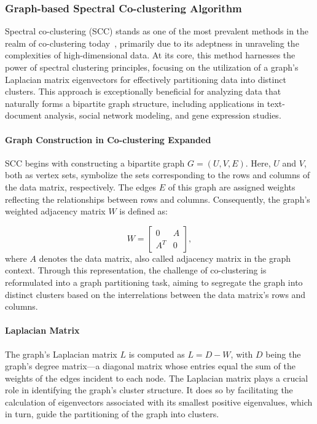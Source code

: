 \documentclass[journal]{IEEEtran}
\renewcommand{\cite}[1]{~\autocite{#1}}
\begin{document}
\subsubsection{Graph-based Spectral Co-clustering Algorithm}

Spectral co-clustering (SCC) stands as one of the most prevalent methods in the realm of co-clustering today\cite{vonluxburg2007TutorialSpectralClustering}, primarily due to its adeptness in unraveling the complexities of high-dimensional data. At its core, this method harnesses the power of spectral clustering principles, focusing on the utilization of a graph's Laplacian matrix eigenvectors for effectively partitioning data into distinct clusters. This approach is exceptionally beneficial for analyzing data that naturally forms a bipartite graph structure, including applications in text-document analysis, social network modeling, and gene expression studies.


\paragraph{Graph Construction in Co-clustering Expanded}

SCC begins with constructing a bipartite graph $G=(U,V,E)$. Here, $U$ and $V$, both as vertex sets, symbolize the sets corresponding to the rows and columns of the data matrix, respectively. The edges $E$ of this graph are assigned weights reflecting the relationships between rows and columns. Consequently, the graph's weighted adjacency matrix $W$ is defined as:

$$ W = \begin{bmatrix} 0 & A \\ A^T & 0 \end{bmatrix}, $$
where $A$ denotes the data matrix, also called adjacency matrix in the graph context.
Through this representation, the challenge of co-clustering is reformulated into a graph partitioning task, aiming to segregate the graph into distinct clusters based on the interrelations between the data matrix's rows and columns.

\paragraph{Laplacian Matrix}

The graph's Laplacian matrix $L$ is computed as $L=D-W$, with $D$ being the graph's degree matrix—a diagonal matrix whose entries equal the sum of the weights of the edges incident to each node. The Laplacian matrix plays a crucial role in identifying the graph's cluster structure. It does so by facilitating the calculation of eigenvectors associated with its smallest positive eigenvalues, which in turn, guide the partitioning of the graph into clusters.
\end{document}
